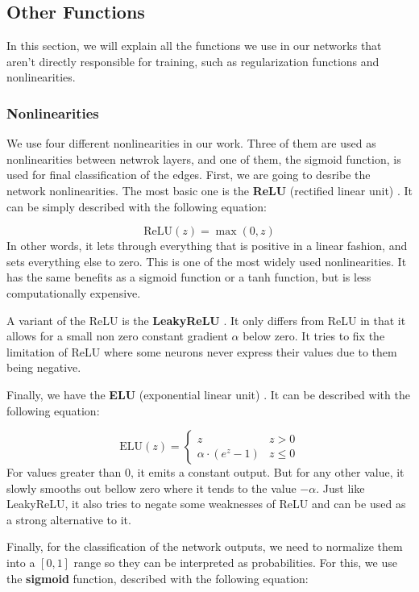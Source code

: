 \documentclass[times, utf8, diplomski, english]{fer_eng}
\begin{document}
\subsection{Other Functions}

In this section, we will explain all the functions we use in our networks that aren't directly responsible for training, such as regularization functions and nonlinearities.

\subsubsection{Nonlinearities}
\label{subsubsec: nonlinearities}


We use four different nonlinearities in our work. Three of them are used as nonlinearities between netwrok layers, and one of them, the sigmoid function, is used for final classification of the edges. First, we are going to desribe the network nonlinearities. The most basic one is the \textbf{ReLU} (rectified linear unit) \cite{relu}.	It can be simply described with the following equation:

\[ \mathrm{ReLU}(z) = \max (0, z) \]
In other words, it lets through everything that is positive in a linear fashion, and sets everything else to zero. This is one of the most widely used nonlinearities. It has the same benefits as a sigmoid function or a tanh function, but is less computationally expensive.

A variant of the ReLU is the \textbf{LeakyReLU} \cite{leakyrelu}. It only differs from ReLU in that it allows for a small non zero constant gradient $\alpha$ below zero. It tries to fix the limitation of ReLU where some neurons never express their values due to them being negative.

Finally, we have the \textbf{ELU} (exponential linear unit) \cite{elu}. It can be described with the following equation:

\[ \mathrm{ELU}(z) = \begin{cases} 
z & z > 0 \\
\alpha \cdot (e^z - 1) & z \leq 0
\end{cases} \]
For values greater than 0, it emits a constant output. But for any other value, it slowly smooths out bellow zero where it tends to the value $- \alpha$. Just like LeakyReLU, it also tries to negate some weaknesses of ReLU and can be used as a strong alternative to it.

Finally, for the classification of the network outputs, we need to normalize them into a $[0, 1]$ range so they can be interpreted as probabilities. For this, we use the \textbf{sigmoid} function, described with the following equation:
\end{document}
